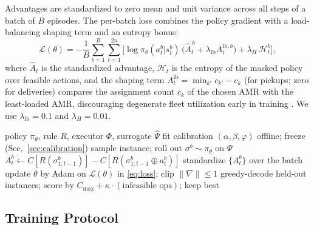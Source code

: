 Advantages are standardized to zero mean and unit variance across all
steps of a batch of $B$ episodes. The per-batch loss combines the
policy gradient with a load-balancing shaping term and an entropy
bonus:
\begin{equation}
\mathcal{L}(\theta)=
-\frac{1}{B}\sum_{b=1}^{B}\sum_{t=1}^{2n}
\Big[\log\pi_\theta(a_t^b|s_t^b)\,
\big(\hat{A}_t^{\,b}+\lambda_{\mathrm{lb}}A_t^{\mathrm{lb},b}\big)
+\lambda_{H}\,\mathcal{H}_t^{b}\Big],
\label{eq:loss}
\end{equation}
where $\hat{A}_t$ is the standardized advantage,
$\mathcal{H}_t$ is the entropy of the masked policy over feasible
actions, and the shaping term
$A^{\mathrm{lb}}_t=\min_{k'}c_{k'}-c_{k}$ (for pickups; zero for
deliveries) compares the assignment count $c_k$ of the chosen AMR with
the least-loaded AMR, discouraging degenerate fleet utilization early
in training \cite{ng1999shaping}. We use
$\lambda_{\mathrm{lb}}=0.1$ and $\lambda_{H}=0.01$.

\begin{algorithm}[t]
\caption{Training with counterfactual dispatch baseline}
\label{alg:training}
\begin{algorithmic}[1]
\Require policy $\pi_\theta$, rule $R$, executor $\Phi$, surrogate $\hat{\Psi}$
\State fit calibration $(\alpha,\beta,\varphi)$ offline; freeze (Sec.~\ref{sec:calibration})
    \State sample instance; roll out $\sigma^b\!\sim\!\pi_\theta$ on $\hat{\Psi}$
      \State $A^b_t \gets C[R(\sigma^b_{1:t-1})]-C[R(\sigma^b_{1:t-1}\oplus a^b_t)]$
    \EndFor
  \EndFor
  \State standardize $\{A^b_t\}$ over the batch
  \State update $\theta$ by Adam on $\mathcal{L}(\theta)$ in \eqref{eq:loss}; clip $\lVert\nabla\rVert\le1$
    \State greedy-decode held-out instances; score by
    $C_{\max}+\kappa\cdot(\text{infeasible ops})$; keep best
  \EndIf
\EndFor
\end{algorithmic}
\end{algorithm}

\subsection{Training Protocol}
\label{sec:training-details}

